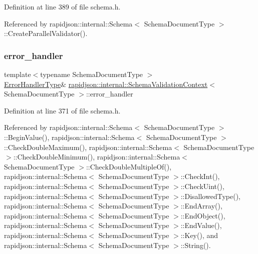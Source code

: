 Definition at line 389 of file schema.\+h.



Referenced by rapidjson\+::internal\+::\+Schema$<$ Schema\+Document\+Type $>$\+::\+Create\+Parallel\+Validator().

\mbox{\label{structrapidjson_1_1internal_1_1_schema_validation_context_a593510056ace8236513cb3d705838ae0}} 
\subsubsection{\texorpdfstring{error\_handler}{error\_handler}}
{\footnotesize\ttfamily template$<$typename Schema\+Document\+Type $>$ \\
\mbox{\hyperlink{structrapidjson_1_1internal_1_1_schema_validation_context_aca18580c026f47ce432a5a53b71c8d24}{Error\+Handler\+Type}}\& \mbox{\hyperlink{structrapidjson_1_1internal_1_1_schema_validation_context}{rapidjson\+::internal\+::\+Schema\+Validation\+Context}}$<$ Schema\+Document\+Type $>$\+::error\+\_\+handler}



Definition at line 371 of file schema.\+h.



Referenced by rapidjson\+::internal\+::\+Schema$<$ Schema\+Document\+Type $>$\+::\+Begin\+Value(), rapidjson\+::internal\+::\+Schema$<$ Schema\+Document\+Type $>$\+::\+Check\+Double\+Maximum(), rapidjson\+::internal\+::\+Schema$<$ Schema\+Document\+Type $>$\+::\+Check\+Double\+Minimum(), rapidjson\+::internal\+::\+Schema$<$ Schema\+Document\+Type $>$\+::\+Check\+Double\+Multiple\+Of(), rapidjson\+::internal\+::\+Schema$<$ Schema\+Document\+Type $>$\+::\+Check\+Int(), rapidjson\+::internal\+::\+Schema$<$ Schema\+Document\+Type $>$\+::\+Check\+Uint(), rapidjson\+::internal\+::\+Schema$<$ Schema\+Document\+Type $>$\+::\+Disallowed\+Type(), rapidjson\+::internal\+::\+Schema$<$ Schema\+Document\+Type $>$\+::\+End\+Array(), rapidjson\+::internal\+::\+Schema$<$ Schema\+Document\+Type $>$\+::\+End\+Object(), rapidjson\+::internal\+::\+Schema$<$ Schema\+Document\+Type $>$\+::\+End\+Value(), rapidjson\+::internal\+::\+Schema$<$ Schema\+Document\+Type $>$\+::\+Key(), and rapidjson\+::internal\+::\+Schema$<$ Schema\+Document\+Type $>$\+::\+String().

